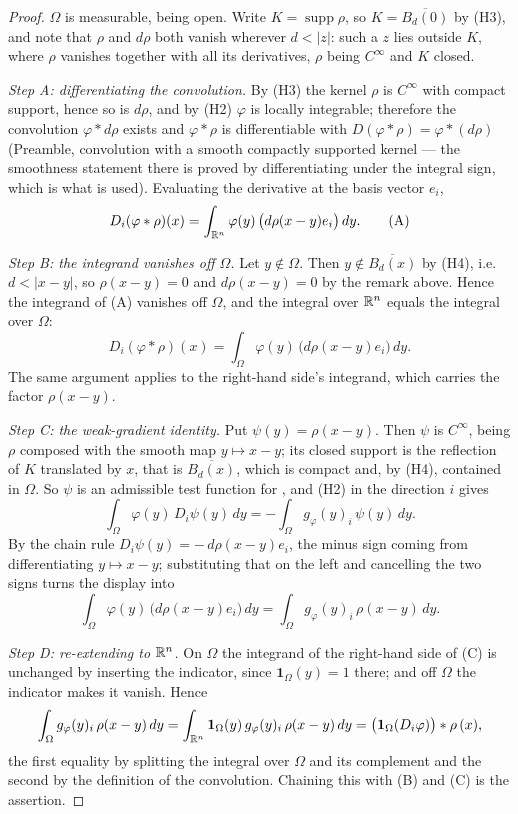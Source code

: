 \begin{proof}
$\Omega$ is measurable, being open.  Write $K=\operatorname{supp}\rho$, so
$K=\overline{B_d(0)}$ by (H3), and note that $\rho$ and $d\rho$ both vanish
wherever $d<|z|$: such a $z$ lies outside $K$, where $\rho$ vanishes together
with all its derivatives, $\rho$ being $C^\infty$ and $K$ closed.

\emph{Step A: differentiating the convolution.}  By (H3) the kernel $\rho$ is
$C^\infty$ with compact support, hence so is $d\rho$, and by (H2) $\varphi$ is
locally integrable; therefore the convolution $\varphi*d\rho$ exists and
$\varphi*\rho$ is differentiable with $D(\varphi*\rho)=\varphi*(d\rho)$
(Preamble, convolution with a smooth compactly supported kernel --- the
smoothness statement there is proved by differentiating under the integral
sign, which is what is used).  Evaluating the derivative at the basis vector
$e_i$,
\[
D_i(\varphi*\rho)(x)=\int_{\mathbb{R}^n}\varphi(y)\,\bigl(d\rho(x-y)e_i\bigr)\,dy .
\tag{A}
\]

\emph{Step B: the integrand vanishes off $\Omega$.}  Let $y\notin\Omega$.  Then
$y\notin\overline{B_d(x)}$ by (H4), i.e.\ $d<|x-y|$, so $\rho(x-y)=0$ and
$d\rho(x-y)=0$ by the remark above.  Hence the integrand of (A) vanishes off
$\Omega$, and the integral over $\mathbb{R}^n$ equals the integral over $\Omega$:
\[
D_i(\varphi*\rho)(x)=\int_\Omega\varphi(y)\,\bigl(d\rho(x-y)e_i\bigr)\,dy .
\tag{B}
\]
The same argument applies to the right-hand side's integrand, which carries the
factor $\rho(x-y)$.

\emph{Step C: the weak-gradient identity.}  Put $\psi(y)=\rho(x-y)$.  Then
$\psi$ is $C^\infty$, being $\rho$ composed with the smooth map
$y\mapsto x-y$; its closed support is the reflection of $K$ translated by $x$,
that is $\overline{B_d(x)}$, which is compact and, by (H4), contained in
$\Omega$.  So $\psi$ is an admissible test function for
, and (H2) in the direction $i$ gives
\[
\int_\Omega\varphi(y)\,D_i\psi(y)\,dy=-\int_\Omega g_\varphi(y)_i\,\psi(y)\,dy .
\]
By the chain rule $D_i\psi(y)=-\,d\rho(x-y)e_i$, the minus sign coming from
differentiating $y\mapsto x-y$; substituting that on the left and cancelling the
two signs turns the display into
\[
\int_\Omega\varphi(y)\,\bigl(d\rho(x-y)e_i\bigr)\,dy
=\int_\Omega g_\varphi(y)_i\,\rho(x-y)\,dy .
\tag{C}
\]

\emph{Step D: re-extending to $\mathbb{R}^n$.}  On $\Omega$ the integrand of the
right-hand side of (C) is unchanged by inserting the indicator, since
$\mathbf1_\Omega(y)=1$ there; and off $\Omega$ the indicator makes it vanish.
Hence
\[
\int_\Omega g_\varphi(y)_i\,\rho(x-y)\,dy
=\int_{\mathbb{R}^n}\mathbf1_\Omega(y)\,g_\varphi(y)_i\,\rho(x-y)\,dy
=\bigl(\mathbf1_\Omega(D_i\varphi)\bigr)*\rho\,(x),
\]
the first equality by splitting the integral over $\Omega$ and its complement
and the second by the definition of the convolution.  Chaining this with (B) and
(C) is the assertion.
\end{proof}
